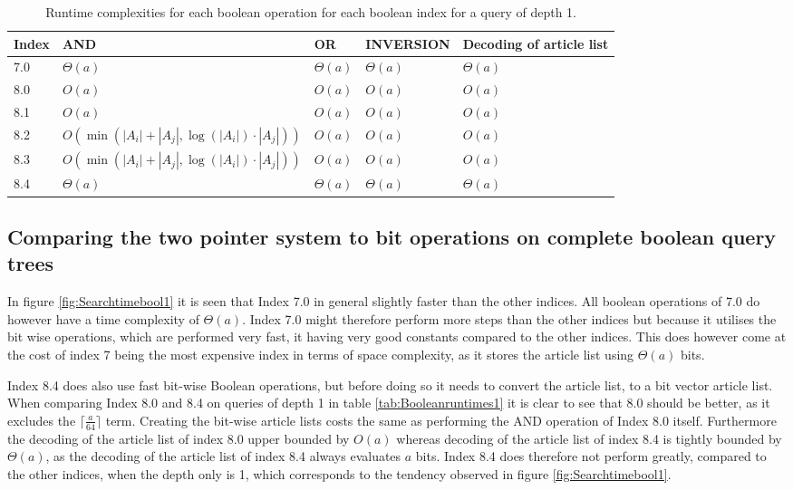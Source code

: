 \begin{table}[H]
\begin{tabular}{l|lllp{2cm}}
    Index & AND & OR & INVERSION & Decoding of article list\\
\hline
7.0 &  $\Theta(a)$   &  $\Theta(a)$  &  $\Theta(a)$ & $\Theta(a)$         \\
8.0 &  $O(a)$   &  $O(a)$  &  $O(a)$  & $O(a)$       \\
8.1 &  $O(a)$   &  $O(a)$  &  $O(a)$  & $O(a)$         \\
8.2 &  $O(\min(|A_i| + |A_j|, \log(|A_i|)\cdot |A_j|))$   &  $O(a)$  &  $O(a)$  & $O(a)$    \\
8.3 &  $O(\min(|A_i| + |A_j|, \log(|A_i|)\cdot |A_j|))$   &  $O(a)$  &  $O(a)$  & $O(a)$     \\
8.4 &  $\Theta(a)$   &   $\Theta(a)$   &  $\Theta(a)$   & $\Theta(a)$
\end{tabular}
\caption{Runtime complexities for each boolean operation for each boolean index for a query of depth 1. }
\label{tab:BooleanruntimesO}
\end{table}

\subsection{Comparing the two pointer system to bit operations on complete boolean query trees}

In figure \ref{fig:Searchtimebool1} it is seen that Index 7.0 in general slightly faster than the other indices. All boolean operations of 7.0 do however have a time complexity of $\Theta(a)$. Index 7.0 might therefore perform more steps than the other indices but because it utilises the bit wise operations, which are performed very fast, it having very good constants compared to the other indices. This does however come at the cost of index 7 being the most expensive index in terms of space complexity, as it stores the article list using $\Theta(a)$ bits. 

Index 8.4 does also use fast bit-wise Boolean operations, but before doing so it needs to convert the article list, to a bit vector article list. When comparing Index 8.0 and 8.4 on queries of depth 1 in table \ref{tab:Booleanruntimes1} it is clear to see that 8.0 should be better, as it excludes the $\lceil \frac{a}{64} \rceil$ term. Creating the bit-wise article lists costs the same as performing the AND operation of Index 8.0 itself. Furthermore the decoding of the article list of index 8.0 upper bounded by $O(a)$ whereas decoding of the article list of index 8.4 is tightly bounded by $\Theta(a)$, as the decoding of the article list of index 8.4 always evaluates $a$ bits. Index 8.4 does therefore not perform greatly, compared to the other indices, when the depth only is 1, which corresponds to the tendency observed in figure \ref{fig:Searchtimebool1}.


